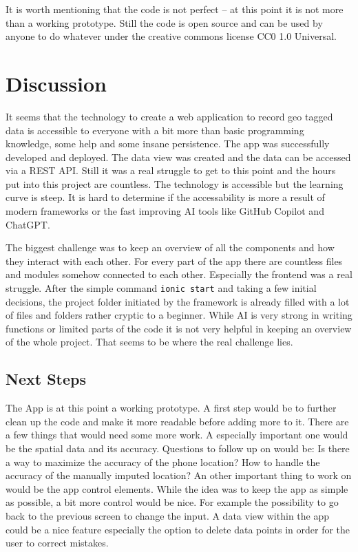 \documentclass{josis}
\begin{document}
It is worth mentioning that the code is not perfect -- at this point it is not more than a working prototype. Still the code is open source and can
be used by anyone to do whatever under the creative commons license CC0 1.0 Universal.

\section{Discussion}

It seems that the technology to create a web application to record geo tagged data is accessible to everyone with a bit more than basic programming knowledge,
some help and some insane persistence. The app was successfully developed and deployed. The data view was created and the data can be accessed via a REST API.
Still it was a real struggle to get to this point and the hours put into this project are countless. The technology is accessible but the learning curve is steep.
It is hard to determine if the accessability is more a result of modern frameworks or the fast improving AI tools like GitHub Copilot and ChatGPT.

The biggest challenge was to keep an overview of all the components and how they interact with each other. For every part of the app there are countless
files and modules somehow connected to each other. Especially the frontend was a real struggle. After the simple command \texttt{ionic start} and
taking a few initial decisions, the project folder initiated by the framework is already filled with a lot of files and folders rather cryptic to a beginner. While AI is
very strong in writing functions or limited parts of the code it is not very helpful in keeping an overview of the whole project.
That seems to be where the real challenge lies.

\subsection{Next Steps}

The App is at this point a working prototype. A first step would be to further clean up the code and make it more readable before adding more to it.
There are a few things that would need some more work. A especially important one would be the spatial data and its accuracy.
Questions to follow up on would be: Is there a way to maximize the accuracy of the phone location? 
How to handle the accuracy of the manually imputed location?
An other important thing to work on would be the app control elements. While the idea was to keep the app as simple as possible,
a bit more control would be nice. For example the possibility to go back to the previous screen to change the input.
A data view within the app could be a nice feature especially the option to delete data points
in order for the user to correct mistakes.
\end{document}
